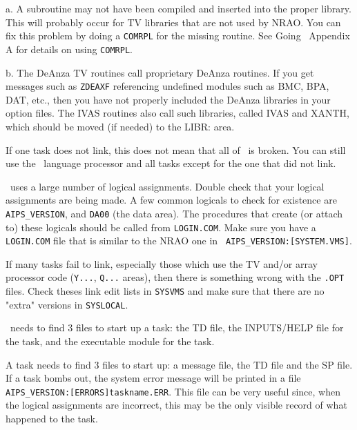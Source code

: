 \item{a.}
A subroutine may not have been compiled and inserted into the proper
library.  This will probably occur for TV libraries that are not
used by NRAO.  You can fix this problem by doing a {\tt COMRPL} for the
missing routine.  See Going \aips\ Appendix A for details on using
{\tt COMRPL}.\medskip

\item{b.}
The DeAnza TV routines call proprietary DeAnza routines.  If you get
messages such as {\tt ZDEAXF} referencing undefined modules such as BMC, BPA,
DAT, etc., then you have not properly included the DeAnza libraries in
your option files.  The IVAS routines also call such libraries, called
IVAS and XANTH, which should be moved (if needed) to the LIBR: area.
\medskip

If one task does not link, this does not mean that all of \aips\ is
broken.  You can still use the \aips\ language processor and all tasks
except for the one that did not link.

\medskip{}

\aips\ uses a large number of logical assignments.  Double check that
your logical assignments are being made.  A few common logicals to
check for existence are {\tt AIPS\_VERSION}, and {\tt DA00} (the data
area).  The procedures that create (or attach to) these logicals
should be called from {\tt LOGIN.COM}.  Make sure you have a {\tt
LOGIN.COM} file that is similar to the NRAO one in {\tt
AIPS\_VERSION:[SYSTEM.VMS]}.

If many tasks fail to link, especially those which use the TV and/or
array processor code ({\tt Y...}, {\tt Q...} areas), then there is
something wrong with the {\tt *.OPT} files.  Check theses link edit
lists in {\tt SYSVMS} and make sure that there are no "extra" versions
in {\tt SYSLOCAL}.

\medskip{}

\aips\ needs to find 3 files to start up a task: the TD file, the
INPUTS/HELP file for the task, and the executable module for the task.

A task needs to find 3 files to start up:  a message file, the TD file
and the SP file.  If a task bombs out, the system error message will be
printed in a file {\tt AIPS\_VERSION:[ERRORS]taskname.ERR}.  This file can be
very useful since, when the logical assignments are incorrect, this may
be the only visible record of what happened to the task.

